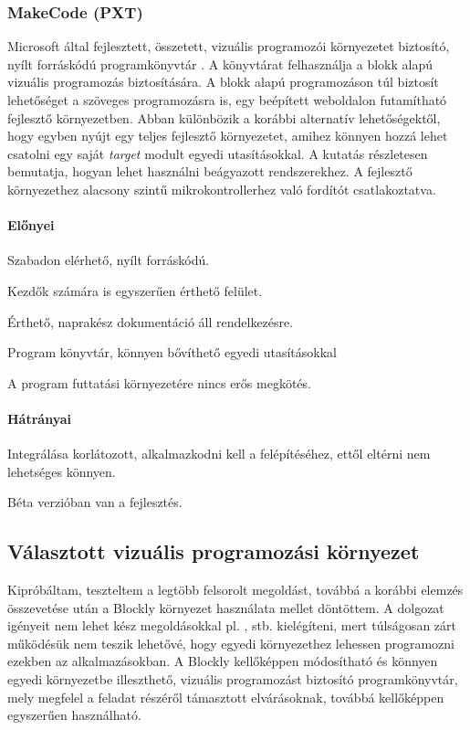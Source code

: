 \documentclass[12pt,a4paper,oneside]{report} %
\begin{document}
\subsubsection{MakeCode (PXT)}
\label{pxt}
Microsoft által fejlesztett, összetett, vizuális programozói környezetet biztosító, nyílt forráskódú programkönyvtár \cite{seneviratne2019makecode}. A  könyvtárat felhasználja a blokk alapú vizuális programozás biztosítására. A blokk alapú programozáson túl biztosít lehetőséget a szöveges programozásra is, egy beépített weboldalon futamítható fejlesztő környezetben. Abban különbözik a korábbi alternatív lehetőségektől, hogy egyben nyújt egy teljes fejlesztő környezetet, amihez könnyen hozzá lehet csatolni egy saját \textit{target} modult egyedi utasításokkal. A \cite{devine2018makecode} kutatás részletesen bemutatja, hogyan lehet használni beágyazott rendszerekhez. A fejlesztő környezethez alacsony szintű mikrokontrollerhez való fordítót csatlakoztatva.
\paragraph{Előnyei} 
\begin{compactitem}
	\item Szabadon elérhető, nyílt forráskódú.
	\item Kezdők számára is egyszerűen érthető felület.
	\item Érthető, naprakész dokumentáció áll rendelkezésre.
	\item Program könyvtár, könnyen bővíthető egyedi utasításokkal
	\item A program futtatási környezetére nincs erős megkötés.
\end{compactitem}
\paragraph{Hátrányai} 
\begin{compactitem}
	\item Integrálása korlátozott, alkalmazkodni kell a felépítéséhez, ettől eltérni nem lehetséges könnyen.
	\item Béta verzióban van a fejlesztés.
\end{compactitem}

\subsection{Választott vizuális programozási környezet}
Kipróbáltam, teszteltem a legtöbb felsorolt megoldást, továbbá a korábbi elemzés összevetése  után a Blockly környezet használata mellet döntöttem.
A dolgozat igényeit nem lehet kész megoldásokkal pl. ,  stb. kielégíteni, mert túlságosan zárt működésük nem teszik lehetővé, hogy egyedi környezethez lehessen programozni ezekben az alkalmazásokban.
A Blockly kellőképpen módosítható és könnyen egyedi környezetbe illeszthető, vizuális programozást biztosító programkönyvtár, mely megfelel a feladat részéről támasztott elvárásoknak, továbbá kellőképpen egyszerűen használható.
\end{document}
